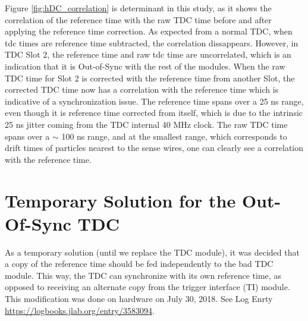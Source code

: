 \documentclass[11pt]{article}
\begin{document}
\newpage
Figure \ref{fig:hDC_correlation} is determinant in this study, as it shows the correlation of the reference time with the raw TDC time before and after applying the reference time correction.
As expected from a normal TDC, when tdc times are reference time subtracted, the correlation dissappears. However, in TDC Slot 2, the reference time and raw tdc time
are uncorrelated, which is an indication that it is Out-of-Sync with the rest of the modules. When the raw TDC time for Slot 2 is corrected with the reference
time from another Slot, the corrected TDC time now has a correlation with the reference time which is indicative of a synchronization issue.
The reference time spans over a 25 ns range, even though it is reference time corrected from itself, which is due to the intrinsic 25 ns jitter coming from the TDC internal 40 MHz clock. The
raw TDC time spans over a $\sim$ 100 ns range, and at the smallest range, which corresponds to drift times of particles nearest to the sense wires, one can clearly see a
correlation with the reference time. 

\section{Temporary Solution for the Out-Of-Sync TDC}
\indent As a temporary solution (until we replace the TDC module), it was decided that a copy of the reference time should be fed independently to the bad TDC module. This way, the TDC can synchronize with its own
reference time, as opposed to receiving an alternate copy from the trigger interface (TI) module. This modification was done on hardware on July 30, 2018. See Log Enrty \url{https://logbooks.jlab.org/entry/3583094}.
\end{document}
